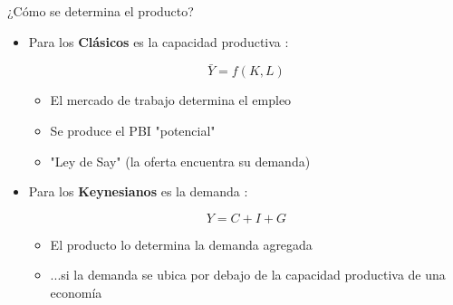 \documentclass{beamer}
\begin{document}
\begin{frame}{¿Cómo se determina el producto?}

    \begin{itemize}
        \item Para los \textbf{Clásicos} es la capacidad productiva \faCogs:
            \begin{center}
            \begin{tcolorbox}[width=2in,
                  interior hidden,
                  boxsep=0pt,
                  left=0pt,
                  right=0pt,
                  top=2pt,
                  ]%
                    $$ \bar{Y}=f(K, L) $$
             \end{tcolorbox}
             \end{center}
             
            \begin{itemize}
            \item El mercado de trabajo determina el empleo
            \item Se produce el PBI "potencial"
              \item "Ley de Say" (la oferta encuentra su demanda)
            \end{itemize}
        
        \item Para los \textbf{Keynesianos} es la demanda \faShoppingBasket:
            
            \begin{center}
            \begin{tcolorbox}[width=2in,
                  interior hidden,
                  boxsep=0pt,
                  left=0pt,
                  right=0pt,
                  top=2pt,
                  ]%
                    $$ Y = C + I + G $$
             \end{tcolorbox}
             \end{center}
             
            \begin{itemize}
            \item El producto lo determina la demanda agregada
            \item ...si la demanda se ubica por debajo de la capacidad productiva de una economía
            \end{itemize}
    \end{itemize}

\end{frame}
\end{document}
